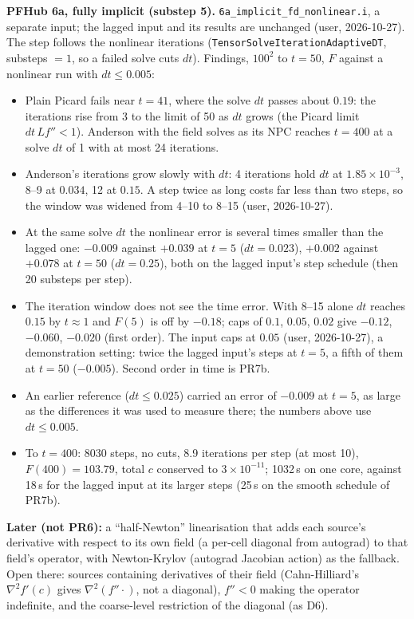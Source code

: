 \documentclass[11pt]{article}
\begin{document}
\textbf{PFHub 6a, fully implicit (substep 5).} \texttt{6a\_implicit\_fd\_nonlinear.i},
a separate input; the lagged input and its results are unchanged (user, 2026-10-27). The
step follows the nonlinear iterations (\texttt{TensorSolveIterationAdaptiveDT}, substeps
$=1$, so a failed solve cuts $dt$). Findings, $100^2$ to $t = 50$, $F$ against a nonlinear
run with $dt \le 0.005$:
\begin{itemize}[leftmargin=*]
\item Plain Picard fails near $t = 41$, where the solve $dt$ passes about $0.19$: the
iterations rise from 3 to the limit of 50 as $dt$ grows (the Picard limit
$dt\,L f'' < 1$). Anderson with the field solves as its NPC reaches $t = 400$ at a solve
$dt$ of 1 with at most 24 iterations.
\item Anderson's iterations grow slowly with $dt$: 4 iterations hold $dt$ at
$1.85\times10^{-3}$, 8--9 at $0.034$, 12 at $0.15$. A step twice as long costs far less
than two steps, so the window was widened from 4--10 to 8--15 (user, 2026-10-27).
\item At the same solve $dt$ the nonlinear error is several times smaller than the lagged
one: $-0.009$ against $+0.039$ at $t = 5$ ($dt = 0.023$), $+0.002$ against $+0.078$ at
$t = 50$ ($dt = 0.25$), both on the lagged input's step schedule (then 20 substeps per step).
\item The iteration window does not see the time error. With 8--15 alone $dt$ reaches
$0.15$ by $t \approx 1$ and $F(5)$ is off by $-0.18$; caps of $0.1$, $0.05$, $0.02$ give
$-0.12$, $-0.060$, $-0.020$ (first order). The input caps at $0.05$ (user,
2026-10-27), a demonstration setting: twice the lagged input's steps at $t = 5$, a fifth of
them at $t = 50$ ($-0.005$). Second order in time is PR7b.
\item An earlier reference ($dt \le 0.025$) carried an error of $-0.009$ at $t = 5$, as large
as the differences it was used to measure there; the numbers above use $dt \le 0.005$.
\item To $t = 400$: 8030 steps, no cuts, 8.9 iterations per step (at most 10),
$F(400) = 103.79$, total $c$ conserved to $3\times10^{-11}$; 1032\,s on one core,
against 18\,s for the lagged input at its larger steps (25\,s on the smooth schedule of PR7b).
\end{itemize}

\textbf{Later (not PR6):} a ``half-Newton'' linearisation that adds each
source's derivative with respect to its own field (a per-cell diagonal from
autograd) to that field's operator, with Newton-Krylov (autograd Jacobian
action) as the fallback. Open there: sources containing derivatives of their
field (Cahn-Hilliard's $\nabla^2 f'(c)$ gives $\nabla^2(f''\cdot)$, not a
diagonal), $f'' < 0$ making the operator indefinite, and the coarse-level
restriction of the diagonal (as D6).
\end{document}
